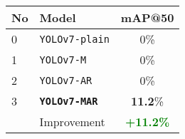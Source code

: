   \begin{tabular}{ l l c }
    \toprule[1.5pt]
    No & Model        &mAP@50 \\
    \midrule
    0  & \texttt{YOLOv7-plain}        & 0\%\\
    1  & \texttt{YOLOv7-M}            & 0\%\\
    2  & \texttt{YOLOv7-AR}           & 0\%\\
    3  & \texttt{\textbf{YOLOv7-MAR}} & \textbf{11.2}\%\\
    \midrule
       & Improvement                  & \textbf{\textcolor{green}{+11.2\%}}\\
    \bottomrule[1.5pt]
  \end{tabular}